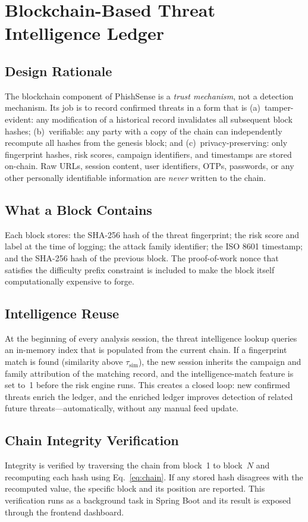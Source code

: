 \documentclass[conference]{IEEEtran}
\begin{document}
\section{Blockchain-Based Threat Intelligence Ledger}

\subsection{Design Rationale}
The blockchain component of PhishSense is a \textit{trust mechanism}, not a detection mechanism.
Its job is to record confirmed threats in a form that is (a)~tamper-evident: any modification of
a historical record invalidates all subsequent block hashes; (b)~verifiable: any party with a
copy of the chain can independently recompute all hashes from the genesis block; and
(c)~privacy-preserving: only fingerprint hashes, risk scores, campaign identifiers, and
timestamps are stored on-chain.
Raw URLs, session content, user identifiers, OTPs, passwords, or any other personally
identifiable information are \textit{never} written to the chain.

\subsection{What a Block Contains}
Each block stores: the SHA-256 hash of the threat fingerprint; the risk score and label at the
time of logging; the attack family identifier; the ISO 8601 timestamp; and the SHA-256 hash of
the previous block.
The proof-of-work nonce that satisfies the difficulty prefix constraint is included to make the
block itself computationally expensive to forge.

\subsection{Intelligence Reuse}
At the beginning of every analysis session, the threat intelligence lookup queries an in-memory
index that is populated from the current chain.
If a fingerprint match is found (similarity above $\tau_{\mathrm{sim}}$), the new session
inherits the campaign and family attribution of the matching record, and the intelligence-match
feature is set to~1 before the risk engine runs.
This creates a closed loop: new confirmed threats enrich the ledger, and the enriched ledger
improves detection of related future threats---automatically, without any manual feed update.

\subsection{Chain Integrity Verification}
Integrity is verified by traversing the chain from block~1 to block~$N$ and recomputing each
hash using Eq.~\eqref{eq:chain}.
If any stored hash disagrees with the recomputed value, the specific block and its position are
reported.
This verification runs as a background task in Spring Boot and its result is exposed through the
frontend dashboard.
\end{document}
